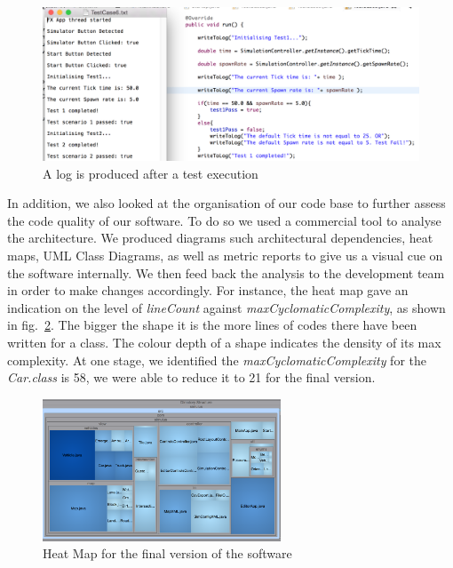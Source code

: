 \begin{figure}[h]
	\begin{center}
		\includegraphics[width=\textwidth]{img/testCase.png}
		\caption{A log is produced after a test execution}
		\label{fig:testCase}
	\end{center}
\end{figure}

In addition, we also looked at the organisation of our code base to further assess the code quality of our software.  To do so we used a commercial tool to analyse the architecture. We produced diagrams such architectural dependencies, heat maps, UML Class Diagrams, as well as metric reports to give us a visual cue on the software internally. We then feed back the analysis to the development team in order to make changes accordingly. For instance, the heat map gave an indication on the level of \textit{lineCount} against \textit{maxCyclomaticComplexity}, as shown in fig.~\ref{fig:heatmap}. The bigger the shape it is the more lines of codes there have been written for a class. The colour depth of a shape indicates the density of its max complexity. At one stage, we identified the \textit{maxCyclomaticComplexity} for the \textit{Car.class} is 58, we were able to reduce it to 21 for the final version.     

\begin{figure}[h]
\begin{minipage}{\textwidth}
	\begin{center}
			\includegraphics[width=71mm,keepaspectratio ]{img/heatmap.png}
		\caption{Heat Map for the final version of the software}
		\label{fig:heatmap}
	\end{center}
	\end{minipage}
\end{figure}

